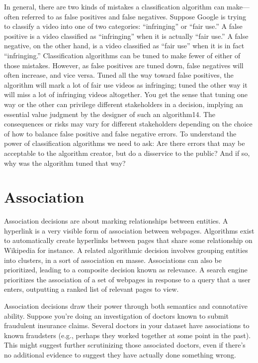 In general, there are two kinds of mistakes a classification algorithm can make—often referred to as false positives and false negatives. Suppose Google is trying to classify a video into one of two categories: ``infringing'' or ``fair use.'' A false positive is a video classified as ``infringing'' when it is actually ``fair use.'' A false negative, on the other hand, is a video classified as ``fair use'' when it is in fact ``infringing.'' Classification algorithms can be tuned to make fewer of either of those mistakes. However, as false positives are tuned down, false negatives will often increase, and vice versa. Tuned all the way toward false positives, the algorithm will mark a lot of fair use videos as infringing; tuned the other way it will miss a lot of infringing videos altogether. You get the sense that tuning one way or the other can privilege different stakeholders in a decision, implying an essential value judgment by the designer of such an algorithm14. The consequences or risks may vary for different stakeholders depending on the choice of how to balance false positive and false negative errors. To understand the power of classification algorithms we need to ask: Are there errors that may be acceptable to the algorithm creator, but do a disservice to the public? And if so, why was the algorithm tuned that way? 

\section{Association} 
Association decisions are about marking relationships between entities. A hyperlink is a very visible form of association between webpages. Algorithms exist to automatically create hyperlinks between pages that share some relationship on Wikipedia for instance. A related algorithmic decision involves grouping entities into clusters, in a sort of association en masse. Associations can also be prioritized, leading to a composite decision known as relevance. A search engine prioritizes the association of a set of webpages in response to a query that a user enters, outputting a ranked list of relevant pages to view. 

Association decisions draw their power through both semantics and connotative ability. Suppose you're doing an investigation of doctors known to submit fraudulent insurance claims. Several doctors in your dataset have associations to known fraudsters (e.g., perhaps they worked together at some point in the past). This might suggest further scrutinizing those associated doctors, even if there's no additional evidence to suggest they have actually done something wrong.

